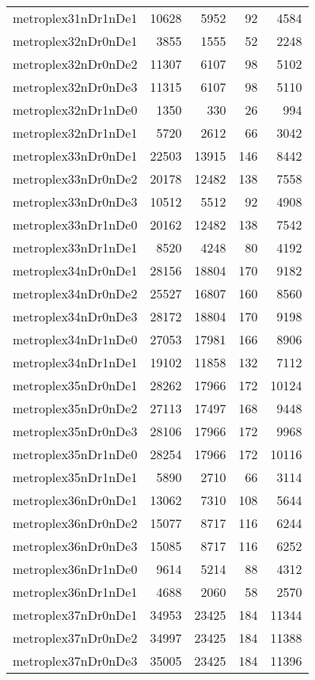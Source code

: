 \begin{longtable}{lrrrr}
metroplex31nDr1nDe1 & 10628 & 5952 & 92 & 4584 \\
metroplex32nDr0nDe1 & 3855 & 1555 & 52 & 2248 \\
metroplex32nDr0nDe2 & 11307 & 6107 & 98 & 5102 \\
metroplex32nDr0nDe3 & 11315 & 6107 & 98 & 5110 \\
metroplex32nDr1nDe0 & 1350 & 330 & 26 & 994 \\
metroplex32nDr1nDe1 & 5720 & 2612 & 66 & 3042 \\
metroplex33nDr0nDe1 & 22503 & 13915 & 146 & 8442 \\
metroplex33nDr0nDe2 & 20178 & 12482 & 138 & 7558 \\
metroplex33nDr0nDe3 & 10512 & 5512 & 92 & 4908 \\
metroplex33nDr1nDe0 & 20162 & 12482 & 138 & 7542 \\
metroplex33nDr1nDe1 & 8520 & 4248 & 80 & 4192 \\
metroplex34nDr0nDe1 & 28156 & 18804 & 170 & 9182 \\
metroplex34nDr0nDe2 & 25527 & 16807 & 160 & 8560 \\
metroplex34nDr0nDe3 & 28172 & 18804 & 170 & 9198 \\
metroplex34nDr1nDe0 & 27053 & 17981 & 166 & 8906 \\
metroplex34nDr1nDe1 & 19102 & 11858 & 132 & 7112 \\
metroplex35nDr0nDe1 & 28262 & 17966 & 172 & 10124 \\
metroplex35nDr0nDe2 & 27113 & 17497 & 168 & 9448 \\
metroplex35nDr0nDe3 & 28106 & 17966 & 172 & 9968 \\
metroplex35nDr1nDe0 & 28254 & 17966 & 172 & 10116 \\
metroplex35nDr1nDe1 & 5890 & 2710 & 66 & 3114 \\
metroplex36nDr0nDe1 & 13062 & 7310 & 108 & 5644 \\
metroplex36nDr0nDe2 & 15077 & 8717 & 116 & 6244 \\
metroplex36nDr0nDe3 & 15085 & 8717 & 116 & 6252 \\
metroplex36nDr1nDe0 & 9614 & 5214 & 88 & 4312 \\
metroplex36nDr1nDe1 & 4688 & 2060 & 58 & 2570 \\
metroplex37nDr0nDe1 & 34953 & 23425 & 184 & 11344 \\
metroplex37nDr0nDe2 & 34997 & 23425 & 184 & 11388 \\
metroplex37nDr0nDe3 & 35005 & 23425 & 184 & 11396 \\

\end{longtable}
